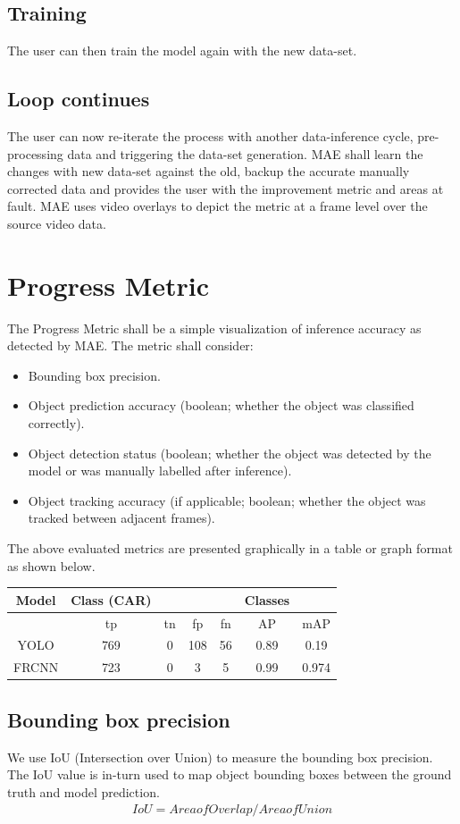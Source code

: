 \documentclass[conference]{IEEEtran}
\begin{document}
\subsection{Training}
The user can then train the model again with the new data-set. 

\subsection{Loop continues}
The user can now re-iterate the process with another data-inference cycle, pre-processing data and triggering the data-set generation. MAE shall learn the changes with new data-set against the old, backup the accurate manually corrected data and provides the user with the improvement metric and areas at fault. MAE uses video overlays to depict the metric at a frame level over the source video data.

\section{Progress Metric}
The Progress Metric shall be a simple visualization of inference accuracy as detected by MAE. The metric shall consider:
\begin{itemize}
	\item Bounding box precision.
	\item Object prediction accuracy (boolean; whether the object was classified correctly).
	\item Object detection status (boolean; whether the object was detected by the model or was manually labelled after inference).
	\item Object tracking accuracy (if applicable; boolean; whether the object was tracked between adjacent frames).
\end{itemize}
The above evaluated metrics are presented graphically in a table or graph format as shown below. 

\begin{tabular}{| c | c | c | c | c | c | c | }
\hline
Model & Class (CAR)  & & & & Classes \\ 
\hline 
     & tp & tn & fp & fn & AP & mAP \\ 
YOLO & 769 & 0 &  108 & 56 & 0.89 & 0.19  \\
FRCNN & 723 & 0 & 3 & 5 & 0.99 & 0.974 \\
\hline
\end{tabular}


\subsection{Bounding box precision}
We use IoU (Intersection over Union) to measure the bounding box precision. The IoU value is in-turn used to map object bounding boxes between the ground truth and model prediction.
\begin{align}
{IoU}={Area of Overlap} / {Area of Union}
\end{align}
\end{document}
